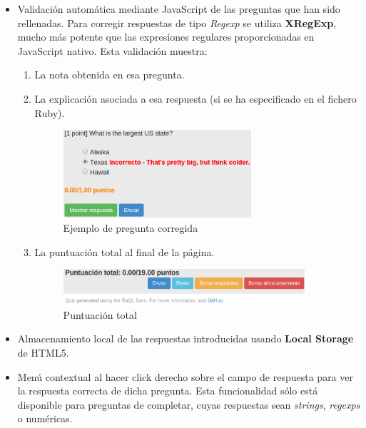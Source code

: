 \begin{itemize}
\begin{itemize}
\begin{itemize}
    \end{itemize}
  \end{itemize}
  
  \item Validaci\'on autom\'atica mediante JavaScript de las preguntas que han sido rellenadas. Para corregir respuestas de tipo \textit{Regexp}
  se utiliza {\bfseries XRegExp}, mucho m\'as potente que las expresiones regulares proporcionadas en JavaScript nativo. Esta validaci\'on muestra:
  \begin{enumerate}
    \item La nota obtenida en esa pregunta.
    \item La explicaci\'on asociada a esa respuesta (si se ha especificado en el fichero Ruby).
    \begin{figure}[H]
    \begin{center}
    \includegraphics[width=0.7\textwidth]{images/validation1.eps}
    \caption{Ejemplo de pregunta corregida}
    \label{fig:validation1}
    \end{center}
    \end{figure}
    \newpage
    
    \item La puntuaci\'on total al final de la p\'agina.
    \begin{figure}[!th]
    \begin{center}
    \includegraphics[width=0.9\textwidth]{images/validation2.eps}
    \caption{Puntuaci\'on total}
    \label{fig:validation2}
    \end{center}
    \end{figure}
    
  \end{enumerate}
  
  \item Almacenamiento local de las respuestas introducidas usando {\bfseries Local Storage} de HTML5.
  \item Men\'u contextual al hacer click derecho sobre el campo de respuesta para ver la respuesta correcta de dicha pregunta.
  Esta funcionalidad s\'olo est\'a disponible para preguntas de completar, cuyas respuestas sean \textit{strings},
  \textit{regexps} o num\'ericas.
  

\end{itemize}
